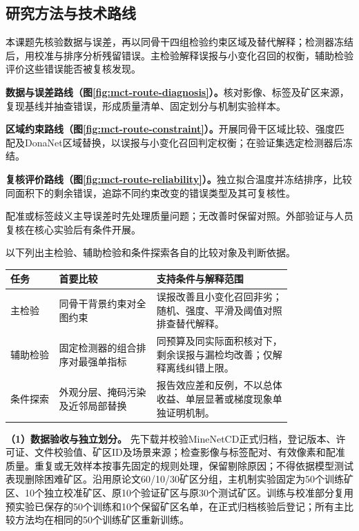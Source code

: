 \subsection{研究方法与技术路线}
本课题先核验数据与误差，再以同骨干四组检验约束区域及替代解释；检测器冻结后，用校准与排序分析残留错误。主检验解释误报与小变化召回的权衡，辅助检验评价这些错误能否被复核发现。

\textbf{数据与误差路线（图\ref{fig:mct-route-diagnosis}）。}核对影像、标签及矿区来源，复现基线并抽查错误，形成质量清单、固定划分与机制实验样本。

\textbf{区域约束路线（图\ref{fig:mct-route-constraint}）。}开展同骨干区域比较、强度匹配及DonaNet区域替换，以误报与小变化召回判定权衡；在验证集选定检测器后冻结。

\textbf{复核评价路线（图\ref{fig:mct-route-reliability}）。}独立拟合温度并冻结排序，比较同面积下的剩余错误，追踪不同约束改变的错误类型及其可复核性。

配准或标签歧义主导误差时先处理质量问题；无改善时保留对照。外部验证与人员复核在核心实验后有条件开展。

以下列出主检验、辅助检验和条件探索各自的比较对象及判断依据。
\begin{center}
\begin{tabular}{p{0.14\linewidth}p{0.28\linewidth}p{0.39\linewidth}}
\hline
任务 & 首要比较 & 支持条件与解释范围 \\
\hline
主检验 & 同骨干背景约束对全图约束 & 误报改善且小变化召回非劣；随机、强度、平滑及阈值对照排查替代解释。 \\
辅助检验 & 固定检测器的组合排序对最强单指标 & 同预算及同实际面积核对下，剩余误报与漏检均改善；仅解释离线纠错上限。 \\
条件探索 & 外观分层、掩码污染及近邻局部替换 & 报告效应差和反例，不以总体收益、单层显著或梯度现象单独证明机制。 \\
\hline
\end{tabular}
\end{center}
\textbf{（1）数据验收与独立划分。}
先下载并校验MineNetCD正式归档，登记版本、许可证、文件校验值、矿区ID及场景来源；检查影像与标签配对、有效像素和配准质量。重复或无效样本按事先固定的规则处理，保留剔除原因；不得依据模型测试表现删除困难矿区。沿用原论文60/10/30矿区分组，主机制实验固定为50个训练矿区、10个独立校准矿区、原10个验证矿区与原30个测试矿区。训练与校准部分复用预实验已保存的50个训练和10个保留矿区名单，在正式归档核验后登记；所有主比较方法均在相同的50个训练矿区重新训练。

